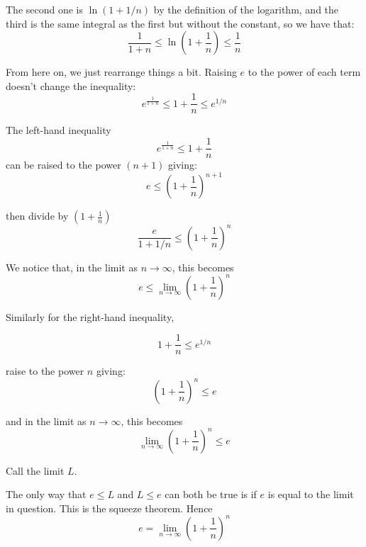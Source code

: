 \documentclass[11pt, oneside]{article}
\begin{document}
The second one is $\ln (1 + 1/n)$ by the definition of the logarithm, and the third is the same integral as the first but without the constant, so we have that:
\[ \frac{1}{1 + n} \le \ln (1 + \frac{1}{n} ) \le \frac{1}{n} \]

From here on, we just rearrange things a bit.  Raising $e$ to the power of each term doesn't change the inequality:
\[ e^{\frac{1}{1 + n}} \le 1 + \frac{1}{n} \le e^{1/n}\]

The left-hand inequality
\[ e^{\frac{1}{1 + n}} \le 1 + \frac{1}{n} \]
can be raised to the power $(n+1)$ giving:
\[ e \le (1 + \frac{1}{n})^{n + 1} \]

then divide by $ (1 + \frac{1}{n})$
\[ \frac{e}{1 + 1/n} \le (1 + \frac{1}{n})^{n} \]

We notice that, in the limit as $n \rightarrow \infty$, this becomes 
\[ e \le  \lim_{n \rightarrow \infty} (1 + \frac{1}{n})^n \]

Similarly for the right-hand inequality, 

\[ 1 + \frac{1}{n} \le e^{1/n}\]

raise to the power $n$ giving:
\[ (1 + \frac{1}{n})^{n} \le e \]

and in the limit as $n \rightarrow \infty$, this becomes
\[ \lim_{n \rightarrow \infty} (1 + \frac{1}{n})^{n} \le e \]

Call the limit $L$.

The only way that $e \le L$ and $L \le e$ can both be true is if $e$ is equal to the limit in question.  This is the squeeze theorem.  Hence
\[ e = \lim_{n \rightarrow \infty} (1 + \frac{1}{n})^n \]
\end{document}
